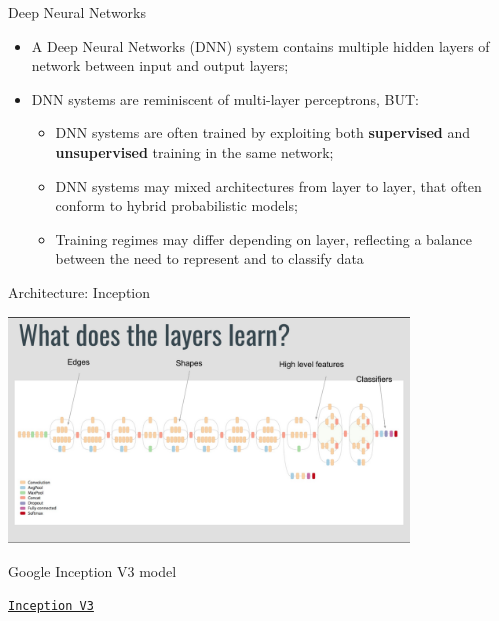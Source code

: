 \documentclass[12pt,t]{beamer}
\begin{document}
\begin{frame}[c]{Deep Neural Networks}

	\begin{itemize}
	\item A Deep Neural Networks (DNN) system contains multiple hidden layers of network between input and output layers;

	\item DNN systems are reminiscent of multi-layer perceptrons, BUT:

		\begin{itemize}
		\item DNN systems are often trained by exploiting both  \textbf{supervised} and  \textbf{unsupervised} training in the same network;

		\item DNN systems may mixed architectures from layer to layer, that often conform to hybrid probabilistic models;

		\item Training regimes may differ depending on layer, reflecting a balance between the need to represent and to classify data

		\end{itemize}
	\end{itemize}
	
\end{frame}

\begin{frame}[c]{Architecture: Inception}

\includegraphics[height=60mm]{Figs/inception_v3_visual_representation.png}

Google Inception V3 model

\hfill
{\footnotesize \lolit
\href{https://research.googleblog.com/2016/03/train-your-own-image-classifier-with.html}{\tt Inception V3}
}

\end{frame}
\end{document}
